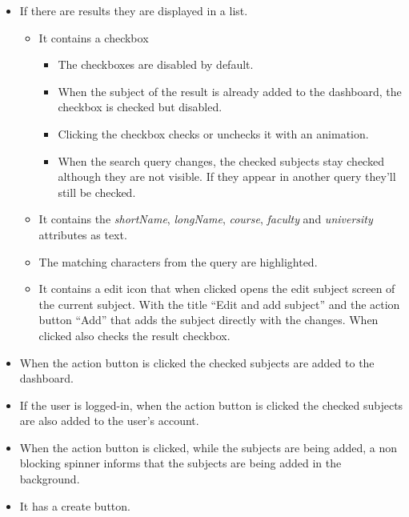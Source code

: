 \begin{itemize}[leftmargin=2cm]
\begin{itemize}[leftmargin=2cm]
    \end{itemize}
    \item[\nextTask{}\label{req:x}] If there are results they are displayed in a list.
    \begin{itemize}[leftmargin=2cm]
        \item[\nextTask{}\label{req:x}] It contains a checkbox
        \begin{itemize}[leftmargin=2cm]
            \item[\nextTask{}\label{req:x}] The checkboxes are disabled by default.
            \item[\nextTask{}\label{req:x}] When the subject of the result is already added to the dashboard, the checkbox is checked but disabled.
            \item[\nextTask{}\label{req:x}] Clicking the checkbox checks or unchecks it with an animation.
            \item[\nextTask{}\label{req:x}] When the search query changes, the checked subjects stay checked although they are not visible. If they appear in another query they'll still be checked.
        \end{itemize}
        \item[\nextTask{}\label{req:x}] It contains the \textit{shortName}, \textit{longName}, \textit{course}, \textit{faculty} and \textit{university} attributes as text.
        \item[\nextTask{}\label{req:x}] The matching characters from the query are highlighted.
        \item[\nextTask{}\label{req:x}] It contains a edit icon that when clicked opens the edit subject screen of the current subject. With the title ``Edit and add subject'' and the action button ``Add'' that adds the subject directly with the changes. When clicked also checks the result checkbox.
    \end{itemize}
    \item[\nextTask{}\label{req:x}] When the action button is clicked the checked subjects are added to the dashboard.
    \item[\nextTask{}\label{req:x}] If the user is logged-in, when the action button is clicked the checked subjects are also added to the user's account.
    \item[\nextTask{}\label{req:x}] When the action button is clicked, while the subjects are being added, a non blocking spinner informs that the subjects are being added in the background.
    \item[\nextTask{}\label{req:x}] It has a create button.

\end{itemize}
